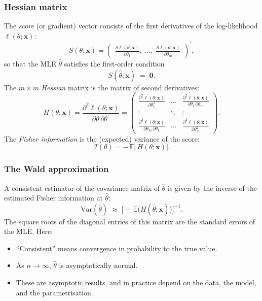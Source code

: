 \documentclass[11pt]{article}
\newcommand{\noi}{\noindent}
\begin{document}
\subsubsection{Hessian matrix}
\noi The \emph{score} (or gradient) vector consists of the first derivatives of the log‐likelihood \(\ell(\theta;\mathbf{x})\):
\[
S(\theta;\mathbf{x})
=\begin{pmatrix}
\displaystyle\frac{\partial\ell(\theta;\mathbf{x})}{\partial\theta_1},\;\dots,\;
\displaystyle\frac{\partial\ell(\theta;\mathbf{x})}{\partial\theta_m}
\end{pmatrix}^{\!\prime},
\]
so that the MLE \(\widehat\theta\) satisfies the first‐order condition
\[
S(\widehat\theta;\mathbf{x}) \;=\; \mathbf{0}.
\]
The \(m\times m\) \emph{Hessian} matrix is the matrix of second derivatives:
\[
H(\theta;\mathbf{x})
=\frac{\partial^2\ell(\theta;\mathbf{x})}
      {\partial\theta\,\partial\theta^{\prime}}
=\begin{pmatrix}
\displaystyle\frac{\partial^2\ell(\theta;\mathbf{x})}
                  {\partial\theta_1^2} & \dots &
\displaystyle\frac{\partial^2\ell(\theta;\mathbf{x})}
                  {\partial\theta_1\,\partial\theta_m}
\\[1ex]
\vdots & \ddots & \vdots
\\[1ex]
\displaystyle\frac{\partial^2\ell(\theta;\mathbf{x})}
                  {\partial\theta_m\,\partial\theta_1}
& \dots &
\displaystyle\frac{\partial^2\ell(\theta;\mathbf{x})}
                  {\partial\theta_m^2}
\end{pmatrix}.
\]
The \emph{Fisher information} is the (expected) variance of the score:
\[
\mathcal{I}(\theta)
=-\,\mathbb{E}\bigl[\,H(\theta;\mathbf{x})\bigr].
\]

\subsubsection{The Wald approximation}
\noi A consistent estimator of the covariance matrix of \(\widehat\theta\) is given by the inverse of the estimated Fisher information at \(\widehat\theta\):
\[
\text{Var}(\widehat\theta)
\;\approx\;
\bigl[-\,\mathbb{E}\bigl(H(\widehat\theta;\mathbf{x})\bigr)\bigr]^{-1}.
\]
The square roots of the diagonal entries of this matrix are the standard errors of the MLE.  Here:
\begin{itemize}
  \item “Consistent” means convergence in probability to the true value.
  \item As \(n\to\infty\), \(\widehat\theta\) is asymptotically normal.
  \item These are asymptotic results, and in practice depend on the data, the model, and the parametrisation.
\end{itemize}
\end{document}
